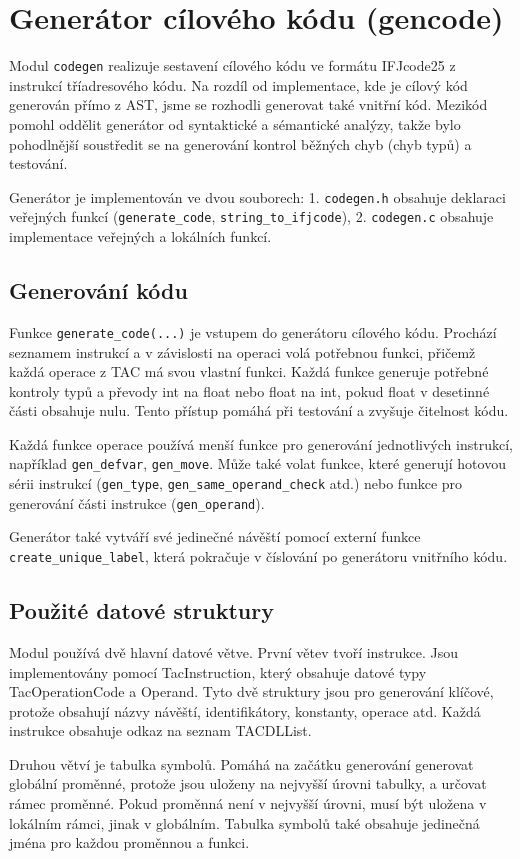 \section{Generátor cílového kódu (gencode)}

Modul \texttt{codegen} realizuje sestavení cílového kódu ve formátu IFJcode25 z instrukcí tříadresového kódu. Na rozdíl od implementace, kde je cílový kód generován přímo z AST, jsme se rozhodli generovat také vnitřní kód. Mezikód pomohl oddělit generátor od syntaktické a sémantické analýzy, takže bylo pohodlnější soustředit se na generování kontrol běžných chyb (chyb typů) a testování. 

Generátor je implementován ve dvou souborech: 1. \texttt{codegen.h} obsahuje deklaraci veřejných funkcí (\texttt{generate\_code}, \texttt{string\_to\_ifjcode}), 2. \texttt{codegen.c} obsahuje implementace veřejných a lokálních funkcí.

\subsection*{Generování kódu}

Funkce \texttt{generate\_code(...)} je vstupem do generátoru cílového kódu. Prochází seznamem instrukcí a v závislosti na operaci volá potřebnou funkci, přičemž každá operace z TAC má svou vlastní funkci. Každá funkce generuje potřebné kontroly typů a převody int na float nebo float na int, pokud float v desetinné části obsahuje nulu. Tento přístup pomáhá při testování a zvyšuje čitelnost kódu.

Každá funkce operace používá menší funkce pro generování jednotlivých instrukcí, například  \texttt{gen\_defvar}, \texttt{gen\_move}. Může také volat funkce, které generují hotovou sérii instrukcí (\texttt{gen\_type}, \texttt{gen\_same\_operand\_check} atd.) nebo funkce pro generování části instrukce (\texttt{gen\_operand}).

Generátor také vytváří své jedinečné návěští pomocí externí funkce \texttt{create\_unique\_label}, která pokračuje v číslování po generátoru vnitřního kódu.

\subsection*{Použité datové struktury}

Modul používá dvě hlavní datové větve. První větev tvoří instrukce. Jsou implementovány pomocí TacInstruction, který obsahuje datové typy TacOperationCode a Operand. Tyto dvě struktury jsou pro generování klíčové, protože obsahují názvy návěští, identifikátory, konstanty, operace atd. Každá instrukce obsahuje odkaz na seznam TACDLList.

Druhou větví je tabulka symbolů. Pomáhá na začátku generování generovat globální proměnné, protože jsou uloženy na nejvyšší úrovni tabulky, a určovat rámec proměnné. Pokud proměnná není v nejvyšší úrovni, musí být uložena v lokálním rámci, jinak v globálním. Tabulka symbolů také obsahuje jedinečná jména pro každou proměnnou a funkci.